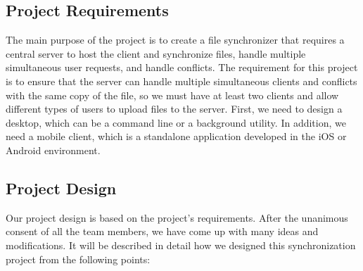 \subsection{Project Requirements}
\noindent The main purpose of the project is to create a file synchronizer that requires a central server to host the client and synchronize files, handle multiple simultaneous user requests, and handle conflicts. The requirement for this project is to ensure that the server can handle multiple simultaneous clients and conflicts with the same copy of the file, so we must have at least two clients and allow different types of users to upload files to the server. First, we need to design a desktop, which can be a command line or a background utility. In addition, we need a mobile client, which is a standalone application developed in the iOS or Android environment.

\subsection{Project Design}
\noindent Our project design is based on the project's requirements. After the unanimous consent of all the team members, we have come up with many ideas and modifications. It will be described in detail how we designed this synchronization project from the following points:

